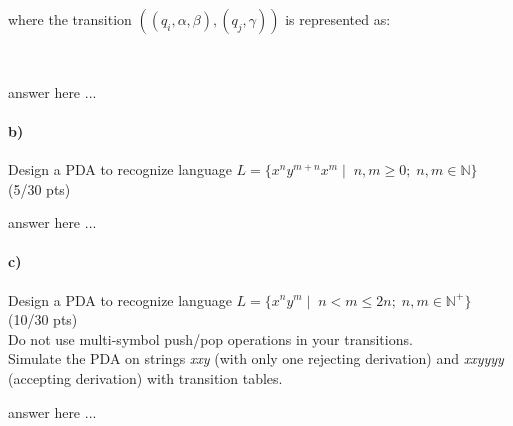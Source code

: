\documentclass[a4paper,12pt]{article}
\begin{document}
\begin{minipage}{0.60\textwidth}
where the transition $((q_i,\alpha,\beta),(q_j,\gamma)) $ is represented as: 
\end{minipage}
\begin{minipage}{0.30\textwidth}
 \\
\end{minipage}


\begin{tcolorbox}
answer here ...
\vspace{2cm} %
\end{tcolorbox}


\paragraph{b)} 
Design a PDA to recognize language $ L=\{x^n y^{m+n} x^m \mid \; n,m \geq 0; \; n,m \in \mathbb{N}  \} $  \hfill \small{(5/30 pts)} \\

\begin{tcolorbox}
answer here ...
\vspace{3cm} %
\end{tcolorbox}

\newpage

\paragraph{c)} 
Design a PDA to recognize language $ L=\{x^n y^m \mid \; n < m \leq 2n; \; n,m \in \mathbb{N^+} \} $  \hfill \small{(10/30 pts)} \\
Do not use multi-symbol push/pop operations in your transitions. \\
Simulate the PDA on strings \textit{xxy} (with only one rejecting derivation) and \textit{xxyyyy} (accepting derivation) with transition tables. \\


\begin{tcolorbox}
answer here ...
\vspace{19cm} %
\end{tcolorbox}
\end{document}
